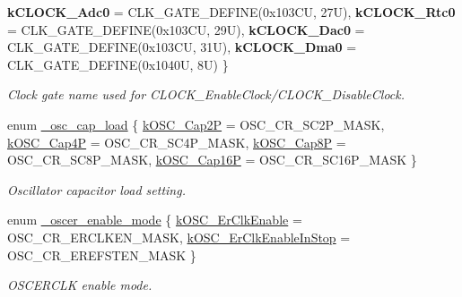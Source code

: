 \begin{DoxyCompactItemize}
{\bfseries k\+C\+L\+O\+C\+K\+\_\+\+Adc0} = C\+L\+K\+\_\+\+G\+A\+T\+E\+\_\+\+D\+E\+F\+I\+NE(0x103\+CU, 27U), 
{\bfseries k\+C\+L\+O\+C\+K\+\_\+\+Rtc0} = C\+L\+K\+\_\+\+G\+A\+T\+E\+\_\+\+D\+E\+F\+I\+NE(0x103\+CU, 29U), 
\newline
{\bfseries k\+C\+L\+O\+C\+K\+\_\+\+Dac0} = C\+L\+K\+\_\+\+G\+A\+T\+E\+\_\+\+D\+E\+F\+I\+NE(0x103\+CU, 31U), 
{\bfseries k\+C\+L\+O\+C\+K\+\_\+\+Dma0} = C\+L\+K\+\_\+\+G\+A\+T\+E\+\_\+\+D\+E\+F\+I\+NE(0x1040U, 8U)
 \}
\begin{DoxyCompactList}\small\item\em Clock gate name used for C\+L\+O\+C\+K\+\_\+\+Enable\+Clock/\+C\+L\+O\+C\+K\+\_\+\+Disable\+Clock. \end{DoxyCompactList}\item 
enum \mbox{\hyperlink{group__clock_gac4d0d3c8c2e6469cde54645a5b66a5b8}{\+\_\+osc\+\_\+cap\+\_\+load}} \{ \mbox{\hyperlink{group__clock_ggac4d0d3c8c2e6469cde54645a5b66a5b8a77a5d0f7cafaccf2f40945bc0980780d}{k\+O\+S\+C\+\_\+\+Cap2P}} = O\+S\+C\+\_\+\+C\+R\+\_\+\+S\+C2\+P\+\_\+\+M\+A\+SK, 
\mbox{\hyperlink{group__clock_ggac4d0d3c8c2e6469cde54645a5b66a5b8a34f7cc6a958e0cd30cd2296393206e2e}{k\+O\+S\+C\+\_\+\+Cap4P}} = O\+S\+C\+\_\+\+C\+R\+\_\+\+S\+C4\+P\+\_\+\+M\+A\+SK, 
\mbox{\hyperlink{group__clock_ggac4d0d3c8c2e6469cde54645a5b66a5b8af2ef9a39bf5174098c60f141c7173d63}{k\+O\+S\+C\+\_\+\+Cap8P}} = O\+S\+C\+\_\+\+C\+R\+\_\+\+S\+C8\+P\+\_\+\+M\+A\+SK, 
\mbox{\hyperlink{group__clock_ggac4d0d3c8c2e6469cde54645a5b66a5b8adfec06bedd2598e3a2dcc5ba43ea23a9}{k\+O\+S\+C\+\_\+\+Cap16P}} = O\+S\+C\+\_\+\+C\+R\+\_\+\+S\+C16\+P\+\_\+\+M\+A\+SK
 \}
\begin{DoxyCompactList}\small\item\em Oscillator capacitor load setting. \end{DoxyCompactList}\item 
enum \mbox{\hyperlink{group__clock_ga4d273c4ee3cf6ad651bc9aacc48bc87f}{\+\_\+oscer\+\_\+enable\+\_\+mode}} \{ \mbox{\hyperlink{group__clock_gga4d273c4ee3cf6ad651bc9aacc48bc87fa3a8d4dec0d80100e2f69db38357970da}{k\+O\+S\+C\+\_\+\+Er\+Clk\+Enable}} = O\+S\+C\+\_\+\+C\+R\+\_\+\+E\+R\+C\+L\+K\+E\+N\+\_\+\+M\+A\+SK, 
\mbox{\hyperlink{group__clock_gga4d273c4ee3cf6ad651bc9aacc48bc87fabc175ffcf6cbcade0f10376b168d4fd9}{k\+O\+S\+C\+\_\+\+Er\+Clk\+Enable\+In\+Stop}} = O\+S\+C\+\_\+\+C\+R\+\_\+\+E\+R\+E\+F\+S\+T\+E\+N\+\_\+\+M\+A\+SK
 \}
\begin{DoxyCompactList}\small\item\em O\+S\+C\+E\+R\+C\+LK enable mode. \end{DoxyCompactList}\item 

\end{DoxyCompactItemize}
